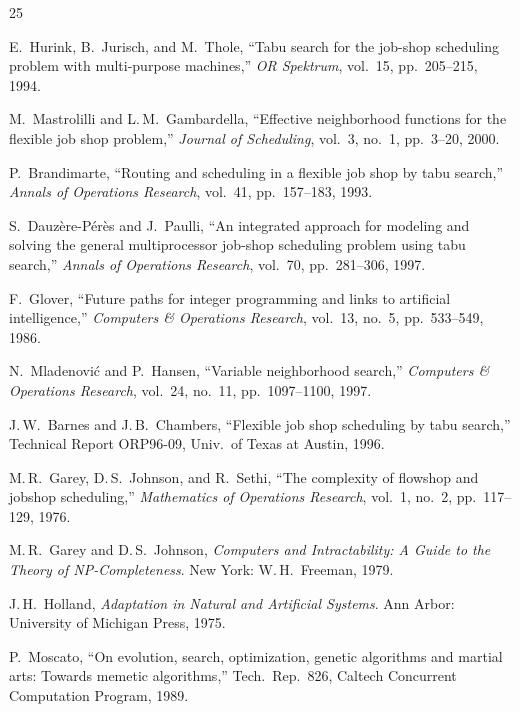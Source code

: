 \documentclass[conference]{IEEEtran}
\begin{document}
\balance
\begin{thebibliography}{25}

E.~Hurink, B.~Jurisch, and M.~Thole,
``Tabu search for the job-shop scheduling problem with multi-purpose
machines,''
\textit{OR Spektrum}, vol.~15, pp.~205--215, 1994.

M.~Mastrolilli and L.\,M.~Gambardella,
``Effective neighborhood functions for the flexible job shop problem,''
\textit{Journal of Scheduling}, vol.~3, no.~1, pp.~3--20, 2000.

P.~Brandimarte,
``Routing and scheduling in a flexible job shop by tabu search,''
\textit{Annals of Operations Research}, vol.~41, pp.~157--183, 1993.

S.~Dauz\`ere-P\'er\`es and J.~Paulli,
``An integrated approach for modeling and solving the general
multiprocessor job-shop scheduling problem using tabu search,''
\textit{Annals of Operations Research}, vol.~70, pp.~281--306, 1997.

F.~Glover,
``Future paths for integer programming and links to artificial
intelligence,''
\textit{Computers \& Operations Research}, vol.~13, no.~5,
pp.~533--549, 1986.

N.~Mladenovi\'c and P.~Hansen,
``Variable neighborhood search,''
\textit{Computers \& Operations Research}, vol.~24, no.~11,
pp.~1097--1100, 1997.

J.\,W.~Barnes and J.\,B.~Chambers,
``Flexible job shop scheduling by tabu search,''
Technical Report ORP96-09, Univ.\ of Texas at Austin, 1996.

M.\,R.~Garey, D.\,S.~Johnson, and R.~Sethi,
``The complexity of flowshop and jobshop scheduling,''
\textit{Mathematics of Operations Research}, vol.~1, no.~2,
pp.~117--129, 1976.

M.\,R.~Garey and D.\,S.~Johnson,
\textit{Computers and Intractability: A Guide to the Theory of
NP-Completeness}.
New York: W.\,H.~Freeman, 1979.

J.\,H.~Holland,
\textit{Adaptation in Natural and Artificial Systems}.
Ann Arbor: University of Michigan Press, 1975.

P.~Moscato,
``On evolution, search, optimization, genetic algorithms and martial
arts: Towards memetic algorithms,''
Tech.\ Rep.\ 826, Caltech Concurrent Computation Program, 1989.


\end{thebibliography}
\end{document}

